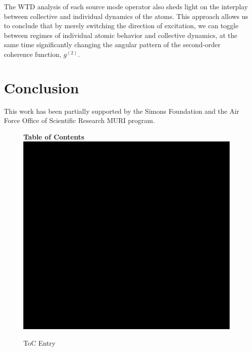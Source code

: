 \documentclass[aps,prl,twocolumn,superscriptaddress,showpacs,amsmath,amssymb]{revtex4-2}
\begin{document}
The WTD analysis of each source mode operator also sheds light on the interplay between collective and individual dynamics of the atoms. This approach allows us to conclude that by merely switching the direction of excitation, we can toggle between regimes of individual atomic behavior and collective dynamics, at the same time significantly changing the angular pattern of the second-order coherence function, $g^{(2)}$.




\section{Conclusion}\label{sec:conclusion}





\begin{acknowledgments}
This work has been partially supported by the Simons Foundation and the Air Force Office of Scientific Research MURI program.
\end{acknowledgments}




\begin{figure}
\textbf{Table of Contents}\\
\medskip
  \includegraphics{toc-image}
  \medskip
  \caption*{ToC Entry}
\end{figure}
\end{document}
